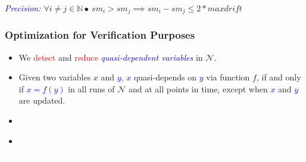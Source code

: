 \documentclass[serif]{beamer}
\begin{document}
\begin{frame}

\emph{\textcolor{blue}{Precision}: $\forall i\neq j\in\mathbb{N}\bullet \ sm_i > sm_j \implies sm_i-sm_j \leq 2*\mathit{maxdrift}$} 
\end{frame}


\begin{frame}\frametitle{\textbf{Optimization for Verification Purposes}}
\begin{itemize}
	\item We \textcolor{red}{detect} and \textcolor{red}{reduce} 
				\emph{\textcolor{blue}{quasi-dependent variables}} in $\mathcal{N}$.
	\item Given two variables \textcolor{blue}{$x$} and \textcolor{blue}{$y$}, \textcolor{blue}{$x$} quasi-depends
on \textcolor{blue}{$y$} via function \textcolor{blue}{$f$}, if and only if \textcolor{blue}{$x=f(y)$} in all 
runs of $\mathcal{N}$ and at all points in time, except when \textcolor{blue}{$x$} and \textcolor{blue}{$y$} are updated.
	\item[] \textcolor{white}{We obtain equivalence classes of quasi-dependent variables.} 
	\item[] \textcolor{white}{We use only the representative clock of each class in a 
				\textcolor{white}{transformed network} which satisfies the same properties as
				the original network.}
\end{itemize}
\end{frame} 
\end{document}
